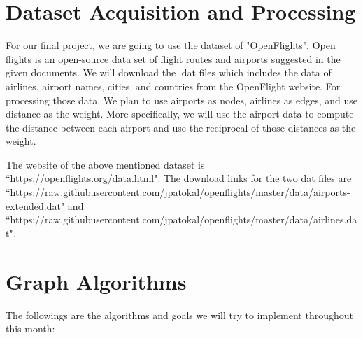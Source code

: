 \documentclass[11pt]{amsart}
\theoremstyle{definition}
\begin{document}
\begin{spacing}{1}
\section{Dataset Acquisition and Processing}
    For our final project, we are going to use the dataset of "OpenFlights". Open flights is an open-source data set of flight routes and airports suggested in the given documents. We will download the .dat files which includes the data of airlines, airport names, cities, and countries from the OpenFlight website. For processing those data, We plan to use airports as nodes, airlines as edges, and use distance as the weight. More specifically, we will use the airport data to compute the distance between each airport and use the reciprocal of those distances as the weight. 

    The website of the above mentioned dataset is ``https://openflights.org/data.html". The download links for the two dat files are ``https://raw.githubusercontent.com/jpatokal/openflights/master/data/airports-extended.dat" and ``https://raw.githubusercontent.com/jpatokal/openflights/master/data/airlines.dat".


\vspace{0.6cm}
\section{Graph Algorithms}
    The followings are the algorithms and goals we will try to implement throughout this month:
    

\end{spacing}
\end{document}
